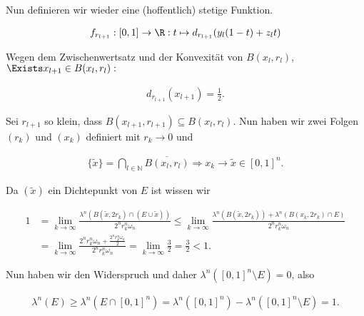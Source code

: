 \begin{solution}
Nun definieren wir wieder eine (hoffentlich) stetige Funktion.

\begin{align*}
  f_{r_{l+1}}:
  [0,1] \to \R:
  t \mapsto d_{r_{l+1}}(y_l(1-t)+z_lt)
\end{align*}

Wegen dem Zwischenwertsatz und der Konvexität von $B(x_l, r_l)$, $\Exists x_{l+1} \in B(x_l,r_l):$

\begin{align*}
  d_{r_{l+1}}(x_{l+1}) = \frac{1}{2}.
\end{align*}

Sei $r_{l+1}$ so klein, dass $B(x_{l+1},r_{l+1}) \subseteq B(x_l,r_l)$. Nun haben wir zwei Folgen $(r_k)$ und $(x_k)$ definiert mit $r_k \to 0$ und

\begin{align*}
  \{ \tilde{x} \}
  = \bigcap_{l \in \mathbb{N}}
    \overline{B(x_l, r_l)}
  \Rightarrow
  x_k \to \tilde{x} \in [0,1]^n.
\end{align*}

Da $(\tilde{x})$ ein Dichtepunkt von $E$ ist wissen wir

\begin{align*}
    1
    & =  \lim_{k \to \infty}
         \frac
         {\lambda^n(B(\tilde{x}, 2 r_k) \cap (E \cup \tilde{x}))}
         {2^n r_k^n \omega_n}
    \leq \lim_{k\to\infty}
         \frac
         { \lambda^n (B(\tilde{x}, 2r_k)) + \lambda^n(B(x_k,2r_k) \cap E) }
         { 2^n r_k^n \omega_n } \\
    & =  \lim_{k\to\infty}
         \frac
         {
           2^n r_k^n \omega_n +
           \frac
           { 2^n r_k^n \omega_n }
           { 2 }
         }{
           2^nr_k^n\omega_n
         }
      =  \lim_{k\to\infty}
         \frac{3}{2}
      =  \frac{3}{2} < 1.
\end{align*}

Nun haben wir den Widerspruch und daher $\lambda^n([0,1]^n \setminus E) = 0$, also

\begin{align*}
  \lambda^n(E) \geq
  \lambda^n(E \cap [0,1]^n) =
  \lambda^n([0,1]^n) -
  \lambda^n([0,1]^n \setminus E) = 1.
\end{align*}

\end{solution}
